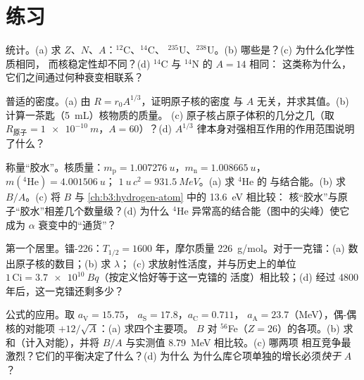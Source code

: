 \section{练习}

\begin{exercise}[$\star$]\label{exo:b3:nuclear-physics:1}
统计。(a) 求 $Z$、$N$、$A$：$^{12}$C、$^{14}$C、
$^{235}$U、$^{238}$U。(b) 哪些是？(c) 为什么化学性质相同，
而核稳定性却不同？(d) $^{14}$C 与 $^{14}$N 的 $A = 14$ 相同：
这类称为什么，
它们之间通过何种衰变相联系？
\end{exercise}

\begin{exercise}[$\star$]\label{exo:b3:nuclear-physics:2}
普适的密度。(a) 由 $R = r_0A^{1/3}$，证明原子核的密度
与 $A$ 无关，并求其值。(b)
计算一茶匙（\qty{5}{mL}）核物质的质量。
(c) 原子核占原子体积的几分之几（取
$R_{\text{原子}} = \qty{1e-10}{m}$，$A = 60$）？(d)
$A^{1/3}$ 律本身对强相互作用的作用范围说明了什么？
\end{exercise}

\begin{exercise}[$\star$]\label{exo:b3:nuclear-physics:3}
称量“胶水”。核质量：$m_{\text{p}} =
\qty{1.007276}{u}$，$m_{\text{n}} = \qty{1.008665}{u}$，
$m(^4\text{He}) = \qty{4.001506}{u}$；
$\qty{1}{u}\,c^2 = \qty{931.5}{MeV}$。(a) 求 $^4$He 的
与结合能。(b) 求 $B/A$。(c)
将 $B$ 与 \cref{ch:b3:hydrogen-atom} 中的 \qty{13.6}{eV} 相比较：
核“胶水”与原子“胶水”相差几个数量级？(d) 为什么
$^4$He 异常高的结合能（图中的尖峰）使它
成为 $\alpha$ 衰变中的“通货”？
\end{exercise}

\begin{exercise}[$\star$]\label{exo:b3:nuclear-physics:4}
第一个居里。镭-226：$T_{1/2} = 1600$ 年，摩尔质量
\qty{226}{g/mol}。对于一克镭：(a) 数出原子核的数目；(b) 求 $\lambda$；
(c) 求放射性活度，并与历史上的单位
$1\,\text{Ci} = \qty{3.7e10}{Bq}$（按定义恰好等于这一克镭的
活度）相比较；(d) 经过 4800 年后，这一克镭还剩多少？
\end{exercise}

\begin{exercise}[$\star\star$]\label{exo:b3:nuclear-physics:5}
公式的应用。取 $a_{\text{V}} = 15.75$，
$a_{\text{S}} = 17.8$，$a_{\text{C}} = 0.711$，
$a_{\text{A}} = 23.7$（\unit{MeV}），偶-偶核的对能项
$+12/\sqrt A$：(a) 求四个主要项。
$B$ 对 $^{56}$Fe（$Z = 26$）的各项。(b) 求和（计入对能），并将
$B/A$ 与实测值 \qty{8.79}{MeV} 相比较。(c) 哪两项
相互竞争最激烈？它们的平衡决定了什么？(d) 为什么
为什么库仑项单独的增长必须\emph{快于} $A$？
\end{exercise}

